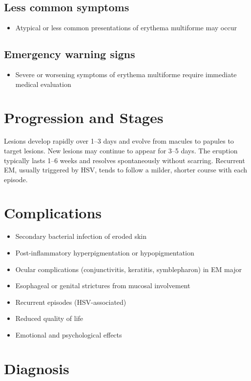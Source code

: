 \subsection{Less common symptoms}
\begin{itemize}[noitemsep]
  \item Atypical or less common presentations of erythema multiforme may occur
\end{itemize}

\subsection{Emergency warning signs}
\begin{itemize}[noitemsep]
  \item Severe or worsening symptoms of erythema multiforme require immediate medical evaluation
\end{itemize}
\section{Progression and Stages}
Lesions develop rapidly over 1--3 days and evolve from macules to papules to target lesions. New lesions may continue to appear for 3--5 days. The eruption typically lasts 1--6 weeks and resolves spontaneously without scarring. Recurrent EM, usually triggered by HSV, tends to follow a milder, shorter course with each episode.

\section{Complications}

\begin{itemize}[noitemsep]
  \item Secondary bacterial infection of eroded skin
  \item Post-inflammatory hyperpigmentation or hypopigmentation
  \item Ocular complications (conjunctivitis, keratitis, symblepharon) in EM major
  \item Esophageal or genital strictures from mucosal involvement
  \item Recurrent episodes (HSV-associated)
  \item Reduced quality of life
  \item Emotional and psychological effects
\end{itemize}

\section{Diagnosis}

